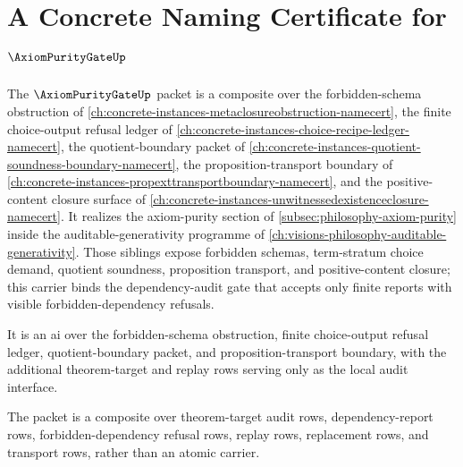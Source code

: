 \chapter{A Concrete Naming Certificate for $\AxiomPurityGateUp$}
\label{ch:concrete-instances-axiom-purity-gate-namecert}

The $\AxiomPurityGateUp$ packet is a composite over the forbidden-schema obstruction of \autoref{ch:concrete-instances-metaclosureobstruction-namecert}, the finite choice-output refusal ledger of \autoref{ch:concrete-instances-choice-recipe-ledger-namecert}, the quotient-boundary packet of \autoref{ch:concrete-instances-quotient-soundness-boundary-namecert}, the proposition-transport boundary of \autoref{ch:concrete-instances-propexttransportboundary-namecert}, and the positive-content closure surface of \autoref{ch:concrete-instances-unwitnessedexistenceclosure-namecert}. It realizes the axiom-purity section of \autoref{subsec:philosophy-axiom-purity} inside the auditable-generativity programme of \autoref{ch:visions-philosophy-auditable-generativity}. Those siblings expose forbidden schemas, term-stratum choice demand, quotient soundness, proposition transport, and positive-content closure; this carrier binds the dependency-audit gate that accepts only finite reports with visible forbidden-dependency refusals.

It is an ai over the forbidden-schema obstruction, finite choice-output refusal ledger, quotient-boundary packet, and proposition-transport boundary, with the additional theorem-target and replay rows serving only as the local audit interface.

The packet is a composite over theorem-target audit rows, dependency-report rows, forbidden-dependency refusal rows, replay rows, replacement rows, and transport rows, rather than an atomic carrier.

